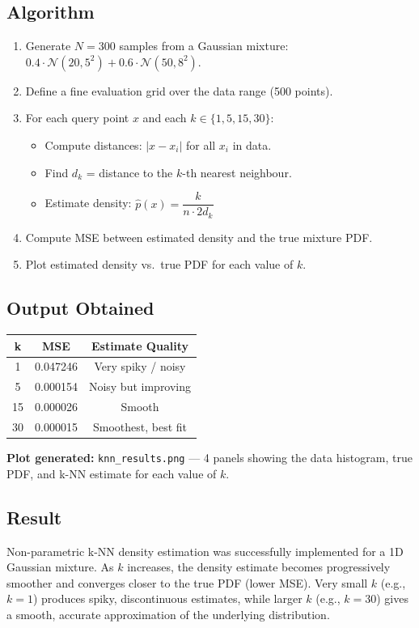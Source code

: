 \documentclass[12pt,a4paper]{article}
\begin{document}
\subsection*{Algorithm}
\begin{enumerate}[leftmargin=*, label=\arabic*.]
  \item Generate $N = 300$ samples from a Gaussian mixture:
    $0.4 \cdot \mathcal{N}(20,5^2) + 0.6 \cdot \mathcal{N}(50,8^2)$.
  \item Define a fine evaluation grid over the data range (500 points).
  \item For each query point $x$ and each $k \in \{1, 5, 15, 30\}$:
    \begin{itemize}
      \item Compute distances: $|x - x_i|$ for all $x_i$ in data.
      \item Find $d_k$ = distance to the $k$-th nearest neighbour.
      \item Estimate density: $\hat{p}(x) = \dfrac{k}{n \cdot 2d_k}$
    \end{itemize}
  \item Compute MSE between estimated density and the true mixture PDF.
  \item Plot estimated density vs.\ true PDF for each value of $k$.
\end{enumerate}

\subsection*{Output Obtained}

\begin{center}
\begin{tabular}{ccc}
\toprule
\textbf{k} & \textbf{MSE} & \textbf{Estimate Quality} \\
\midrule
1  & 0.047246 & Very spiky / noisy \\
5  & 0.000154 & Noisy but improving \\
15 & 0.000026 & Smooth \\
30 & 0.000015 & Smoothest, best fit \\
\bottomrule
\end{tabular}
\end{center}

\noindent \textbf{Plot generated:} \texttt{knn\_results.png} --- 4 panels showing the data
histogram, true PDF, and k-NN estimate for each value of $k$.

\subsection*{Result}
Non-parametric k-NN density estimation was successfully implemented for a 1D Gaussian mixture.
As $k$ increases, the density estimate becomes progressively smoother and converges closer
to the true PDF (lower MSE). Very small $k$ (e.g., $k=1$) produces spiky, discontinuous
estimates, while larger $k$ (e.g., $k=30$) gives a smooth, accurate approximation of the
underlying distribution.
\end{document}
